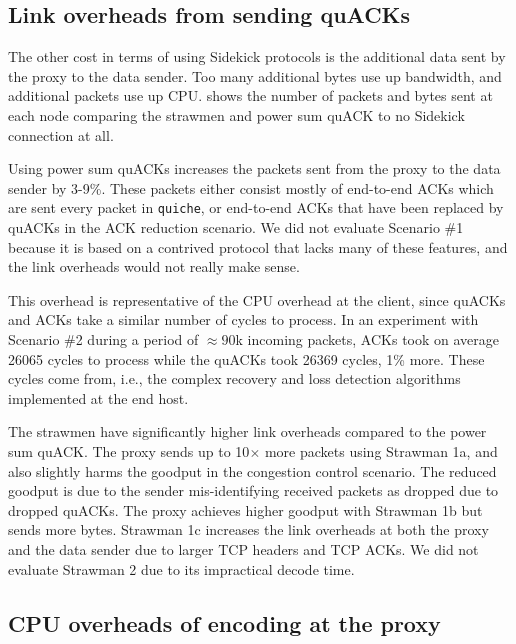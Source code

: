 \subsection{Link overheads from sending quACKs}
\label{sec:sidekick:emulation:link-overheads}



The other cost in terms of using Sidekick protocols is the additional data
sent by the proxy to the data sender.
Too many additional bytes use up bandwidth, and additional packets use
up CPU\@.
 shows the number of packets and bytes sent at each
node comparing the strawmen and power sum quACK to no Sidekick connection at all.

Using power sum quACKs increases the packets sent from the proxy to the data
sender
by 3-9\%. These packets either consist mostly
of end-to-end ACKs which are sent every packet in \texttt{quiche}, or end-to-end
ACKs that have been replaced by quACKs in the ACK reduction scenario.
We did not evaluate Scenario \#1 because it is based
on a contrived protocol that lacks many of these features, and the link
overheads would not really make sense.

This overhead is representative of the CPU overhead at the client, since
quACKs and ACKs take a similar number of cycles to process. In an experiment
with Scenario \#2 during a period of $\approx90$k incoming packets, ACKs took on
average 26065 cycles to process while the quACKs took 26369 cycles, 1\% more.
These cycles come from, i.e., the complex recovery and loss detection algorithms
implemented at the end host.

The strawmen have significantly higher link overheads compared to the power sum
quACK\@. The proxy sends up to 10$\times$ more packets using Strawman 1a, and
also slightly harms the goodput in the congestion control scenario.
The reduced goodput is due to the sender mis-identifying received packets as
dropped due to dropped quACKs.
The proxy achieves higher goodput with Strawman 1b but sends
more bytes. Strawman 1c increases the link overheads at both the proxy and the
data sender due to larger TCP headers and TCP ACKs.
We did not evaluate Strawman 2 due to its impractical decode time.

\subsection{CPU overheads of encoding at the proxy}
\label{sec:sidekick:emulation:cpu-overheads}

